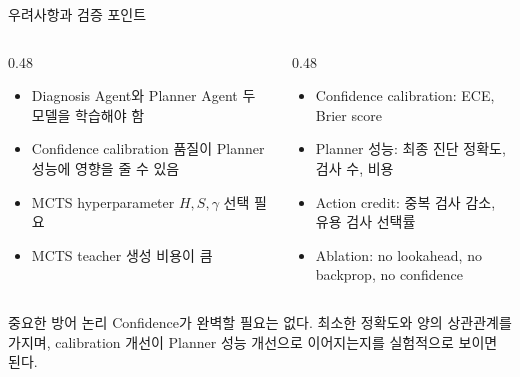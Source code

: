 \documentclass[
11pt,notheorems,hyperref={pdfauthor=whatever}
]{beamer}
\begin{document}
\begin{frame}{우려사항과 검증 포인트}
\vspace{0.1em}
\begin{columns}[T,onlytextwidth]
\begin{column}{0.48\textwidth}
\begin{center}
\end{center}
\vspace{0.2em}
\scriptsize
\begin{itemize}
  \item Diagnosis Agent와 Planner Agent 두 모델을 학습해야 함
  \item Confidence calibration 품질이 Planner 성능에 영향을 줄 수 있음
  \item MCTS hyperparameter \(H,S,\gamma\) 선택 필요
  \item MCTS teacher 생성 비용이 큼
\end{itemize}
\end{column}
\begin{column}{0.48\textwidth}
\begin{center}
\end{center}
\vspace{0.2em}
\scriptsize
\begin{itemize}
  \item Confidence calibration: ECE, Brier score
  \item Planner 성능: 최종 진단 정확도, 검사 수, 비용
  \item Action credit: 중복 검사 감소, 유용 검사 선택률
  \item Ablation: no lookahead, no backprop, no confidence
\end{itemize}
\end{column}
\end{columns}

\vspace{0.35em}
\begin{alertblock}{중요한 방어 논리}
\small
Confidence가 완벽할 필요는 없다. 최소한 정확도와 양의 상관관계를 가지며, calibration 개선이 Planner 성능 개선으로 이어지는지를 실험적으로 보이면 된다.
\end{alertblock}
\end{frame}
\end{document}
